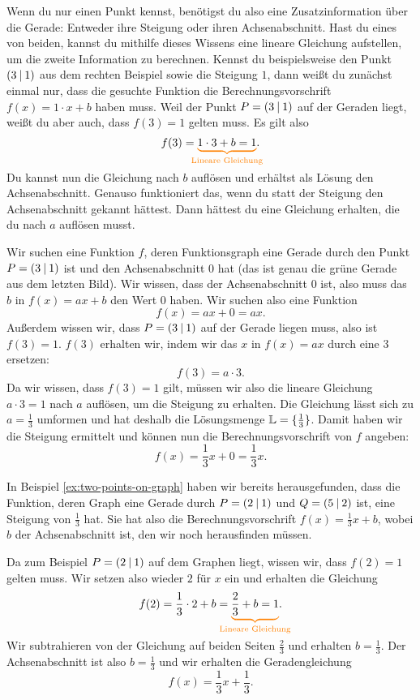 \documentclass[../../main.tex]{subfiles}
\begin{document}
Wenn du nur einen Punkt kennst, benötigst du also eine Zusatzinformation über die Gerade: Entweder ihre Steigung oder ihren Achsenabschnitt. Hast du eines von beiden, kannst du mithilfe dieses Wissens eine lineare Gleichung aufstellen, um die zweite Information zu berechnen. Kennst du beispielsweise den Punkt $\left(3 \:\middle|\: 1\right)$ aus dem rechten Beispiel sowie die Steigung $1$, dann weißt du zunächst einmal nur, dass die gesuchte Funktion die Berechnungsvorschrift $f(x)=1\cdot x+b$ haben muss. Weil der Punkt $P=\left(3 \:\middle|\: 1\right)$ auf der Geraden liegt, weißt du aber auch, dass $f(3)=1$ gelten muss. Es gilt also 
\[f(3)=\colorbrace{1\cdot 3+b=1}{\text{Lineare Gleichung}}.\]
Du kannst nun die Gleichung nach $b$ auflösen und erhältst als Lösung den Achsenabschnitt. Genauso funktioniert das, wenn du statt der Steigung den Achsenabschnitt gekannt hättest. Dann hättest du eine Gleichung erhalten, die du nach $a$ auflösen musst.

\begin{example}{}
    Wir suchen eine Funktion $f$, deren Funktionsgraph eine Gerade durch den Punkt $P=\left(3 \:\middle|\: 1\right)$ ist und den Achsenabschnitt $0$ hat (das ist genau die grüne Gerade aus dem letzten Bild). Wir wissen, dass der Achsenabschnitt $0$ ist, also muss das $b$ in $f(x)=ax+b$ den Wert $0$ haben. Wir suchen also eine Funktion
    \[f(x)=ax+0=ax.\]
    Außerdem wissen wir, dass $P=\left(3 \:\middle|\: 1\right)$ auf der Gerade liegen muss, also ist $f(3)=1$. $f(3)$ erhalten wir, indem wir das $x$ in $f(x)=ax$ durch eine $3$ ersetzen:
    \[f(3)=a\cdot 3.\]
    Da wir wissen, dass $f(3)=1$ gilt, müssen wir also die lineare Gleichung $a\cdot 3=1$ nach $a$ auflösen, um die Steigung zu erhalten. Die Gleichung lässt sich zu $a=\frac{1}{3}$ umformen und hat deshalb die Lösungsmenge $\mathbb{L}=\{\frac{1}{3}\}$. Damit haben wir die Steigung ermittelt und können nun die Berechnungsvorschrift von $f$ angeben:
    \[f(x)=\frac{1}{3}x+0=\frac{1}{3}x.\]
\end{example}
\begin{example}{}
    In Beispiel \ref{ex:two-points-on-graph} haben wir bereits herausgefunden, dass die Funktion, deren Graph eine Gerade durch $P=\left(2 \:\middle|\: 1\right)$ und $Q=\left(5 \:\middle|\: 2\right)$ ist, eine Steigung von $\frac{1}{3}$ hat. Sie hat also die Berechnungsvorschrift $f(x)=\frac{1}{3}x+b$, wobei $b$ der Achsenabschnitt ist, den wir noch herausfinden müssen.

    Da zum Beispiel $P=\left(2 \:\middle|\: 1\right)$ auf dem Graphen liegt, wissen wir, dass $f(2)=1$ gelten muss. Wir setzen also wieder $2$ für $x$ ein und erhalten die Gleichung
    \[f(2)=\frac{1}{3}\cdot 2+b=\colorbrace{\frac{2}{3}+b=1}{\text{Lineare Gleichung}}.\]
    Wir subtrahieren von der Gleichung auf beiden Seiten $\frac{2}{3}$ und erhalten $b=\frac{1}{3}$. Der Achsenabschnitt ist also $b=\frac{1}{3}$ und wir erhalten die Geradengleichung
    \[f(x)=\frac{1}{3}x+\frac{1}{3}.\]
\end{example}
\end{document}
